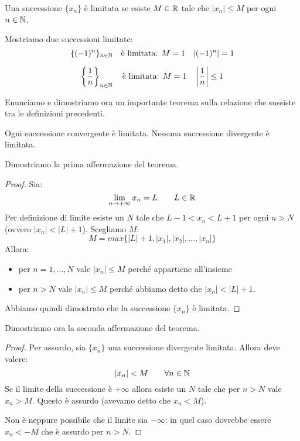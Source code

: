 \begin{definition}
Una successione $\{x_n\}$ è limitata se esiste $M \in \mathbb R$ tale che $|x_n| \le M$ per ogni $n \in \mathbb N$.
\end{definition}

\begin{example}
Mostriamo due successioni limitate:
\begin{equation*}
\{(-1)^n\}_{n \in \mathbb N} \quad \text{è limitata: } M = 1 \quad |(-1)^n| = 1
\end{equation*}

\begin{equation*}
\left\{ \frac{1}{n} \right\}_{n \in \mathbb N} \quad \text{è limitata: } M = 1 \quad \left|\frac{1}{n}\right| \le 1
\end{equation*}
\end{example}

Enunciamo e dimostriamo ora un importante teorema sulla relazione che sussiste tra le definizioni precedenti.
\begin{theorem}
Ogni successione convergente è limitata. Nessuna successione divergente è limitata.
\end{theorem}
Dimostriamo la prima affermazione del teorema.
\begin{proof}
Sia:
\begin{equation*}
\lim_{n \to +\infty} x_n = L \qquad L \in \mathbb R
\end{equation*}
Per definizione di limite esiste un $N$ tale che $L - 1 < x_n < L + 1$ per ogni $n > N$ (ovvero $|x_n| < |L| + 1$).
Scegliamo $M$:
\begin{equation*}
M = max\{|L|+1, |x_1|, |x_2|, \ldots, |x_n|\}
\end{equation*}
Allora:
\begin{itemize}
\item per $n = 1, \ldots, N$ vale $|x_n| \le M$ perché appartiene all'insieme
\item per $n > N$ vale $|x_n| \le M$ perché abbiamo detto che $|x_n| < |L| + 1$.
\end{itemize}
Abbiamo quindi dimostrato che la successione $\{x_n\}$ è limitata.
\end{proof}
Dimostriamo ora la seconda affermazione del teorema.
\begin{proof}
Per assurdo, sia $\{x_n\}$ una successione divergente limitata. Allora deve valere:
\begin{equation*}
|x_n| < M \qquad \forall n \in \mathbb N
\end{equation*}
Se il limite della successione è $+\infty$ allora esiste un $N$ tale che per $n > N$ vale $x_n > M$. Questo è assurdo (avevamo detto che $x_n < M$).

Non è neppure possibile che il limite sia $-\infty$: in quel caso dovrebbe essere $x_n < -M$ che è assurdo per $n > N$.
\end{proof}

